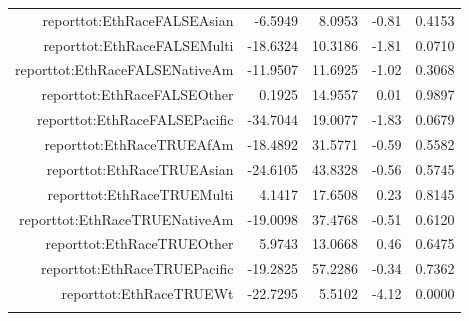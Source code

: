 \documentclass{article}
\begin{document}
{\begin{longtable}{rrrrr}
$$  reporttot:EthRaceFALSEAsian & -6.5949 & 8.0953 & -0.81 & 0.4153 \\ 
  reporttot:EthRaceFALSEMulti & -18.6324 & 10.3186 & -1.81 & 0.0710 \\ 
  reporttot:EthRaceFALSENativeAm & -11.9507 & 11.6925 & -1.02 & 0.3068 \\ 
  reporttot:EthRaceFALSEOther & 0.1925 & 14.9557 & 0.01 & 0.9897 \\ 
  reporttot:EthRaceFALSEPacific & -34.7044 & 19.0077 & -1.83 & 0.0679 \\ 
  reporttot:EthRaceTRUEAfAm & -18.4892 & 31.5771 & -0.59 & 0.5582 \\ 
  reporttot:EthRaceTRUEAsian & -24.6105 & 43.8328 & -0.56 & 0.5745 \\ 
  reporttot:EthRaceTRUEMulti & 4.1417 & 17.6508 & 0.23 & 0.8145 \\ 
  reporttot:EthRaceTRUENativeAm & -19.0098 & 37.4768 & -0.51 & 0.6120 \\ 
  reporttot:EthRaceTRUEOther & 5.9743 & 13.0668 & 0.46 & 0.6475 \\ 
  reporttot:EthRaceTRUEPacific & -19.2825 & 57.2286 & -0.34 & 0.7362 \\ 
  reporttot:EthRaceTRUEWt & -22.7295 & 5.5102 & -4.12 & 0.0000 \\ 
   \hline
\hline
\label{tab:OrthoSQFT}
\end{longtable}
}
\end{document}
